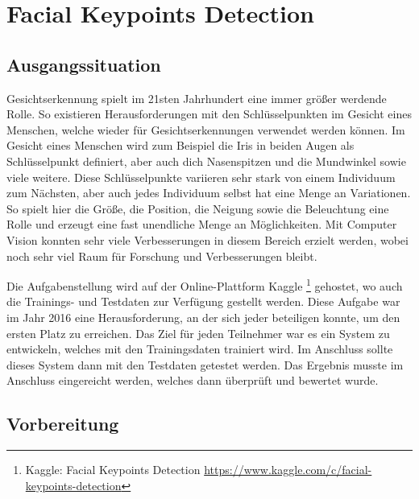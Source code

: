 \chapter{Facial Keypoints Detection}
\label{cha:Facial Keypoints Detection}

\section{Ausgangssituation}

Gesichtserkennung spielt im 21sten Jahrhundert eine immer größer werdende Rolle. 
So existieren Herausforderungen mit den Schlüsselpunkten im Gesicht eines Menschen, welche wieder für Gesichtserkennungen verwendet werden können. 
Im Gesicht eines Menschen wird zum Beispiel die Iris in beiden Augen als Schlüsselpunkt definiert, aber auch dich Nasenspitzen und die Mundwinkel sowie viele weitere.
Diese Schlüsselpunkte variieren sehr stark von einem Individuum zum Nächsten, aber auch jedes Individuum selbst hat eine Menge an Variationen. 
So spielt hier die Größe, die Position, die Neigung sowie die Beleuchtung eine Rolle und erzeugt eine fast unendliche Menge an Möglichkeiten. 
Mit Computer Vision konnten sehr viele Verbesserungen in diesem Bereich erzielt werden, wobei noch sehr viel Raum für Forschung und Verbesserungen bleibt. \newline

\noindent
Die Aufgabenstellung wird auf der Online-Plattform Kaggle \footnote{Kaggle: Facial Keypoints Detection \url{https://www.kaggle.com/c/facial-keypoints-detection}} gehostet, wo auch die Trainings- und Testdaten zur Verfügung gestellt werden. 
Diese Aufgabe war im Jahr 2016 eine Herausforderung, an der sich jeder beteiligen konnte, um den ersten Platz zu erreichen. 
Das Ziel für jeden Teilnehmer war es ein System zu entwickeln, welches mit den Trainingsdaten trainiert wird.
Im Anschluss sollte dieses System dann mit den Testdaten getestet werden. 
Das Ergebnis musste im Anschluss eingereicht werden, welches dann überprüft und bewertet wurde. 

\section{Vorbereitung}

